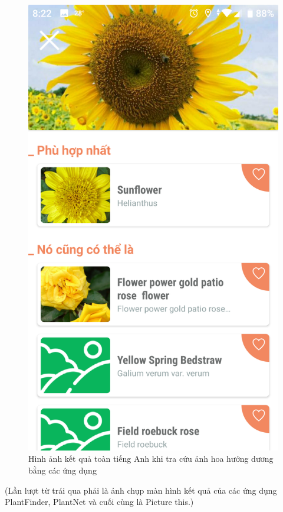 \documentclass[12pt]{report}
\begin{document}
\begin{figure}[h]
			\includegraphics[scale=0.13]{app_en_3}
			\caption{Hình ảnh kết quả toàn tiếng Anh khi tra cứu ảnh hoa hướng dương bằng các ứng dụng}
			\label{fig:app_en}
		\end{figure}
		(Lần lượt từ trái qua phải là ảnh chụp màn hình kết quả của các ứng dụng PlantFinder, PlantNet và cuối cùng là Picture this.)
																
\end{document}
